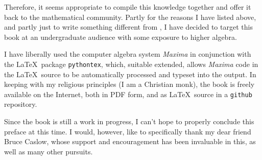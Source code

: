 Therefore, it seems appropriate to compile this knowledge together and
offer it back to the mathematical community.
Partly for the reasons I have listed above, and partly just to write
something different from \cite{bronstein book}, I have decided to
target this book at an undergraduate audience with some exposure to
higher algebra.

I have liberally used the computer algebra system
{\it Maxima} in conjunction with the \LaTeX\ package {\tt pythontex}, which,
suitable extended, allows {\it Maxima} code in the \LaTeX\ source to be
automatically processed and typeset into the output.  In keeping with
my religious principles (I am a Christian monk), the book is freely
available on the Internet, both in PDF form, and as \LaTeX\ source
in a {\tt github} repository.

Since the book is still a work in progress, I can't hope to properly
conclude this preface at this time.  I would, however, like to
specifically thank my dear friend Bruce Caslow, whose support and
encouragement has been invaluable in this, as well as many other
pursuits.

